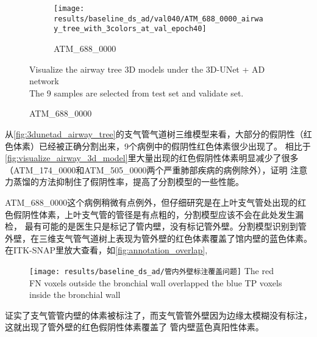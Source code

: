 \begin{figure}[!htp]
    \hfill
    \begin{subfigure}{0.325\textwidth}
        \texttt{[image: results/baseline\_ds\_ad/val040/ATM\_688\_0000\_airway\_tree\_with\_3colors\_at\_val\_epoch40]}
        \caption{ATM\_688\_0000}
    \end{subfigure}
        {Visualize the airway tree 3D models under the 3D-UNet + AD network\\
        The 9 samples are selected from test set and validate set.}
    \label{fig:3dunetad_airway_tree}
\end{figure}

从\autoref{fig:3dunetad_airway_tree}的支气管气道树三维模型来看，大部分的假阴性（红色体素）已经被正确分割出来，9个病例中的假阴性红色体素很少出现了。
相比于\autoref{fig:visualize_airway_3d_model}里大量出现的红色假阴性体素明显减少了很多（ATM\_174\_0000和ATM\_505\_0000两个严重肺部疾病的病例除外），证明
注意力蒸馏的方法抑制住了假阴性率，提高了分割模型的一些性能。

ATM\_688\_0000这个病例稍微有点例外，但仔细研究是在上叶支气管处出现的红色假阴性体素，上叶支气管的管径是有点粗的，分割模型应该不会在此处发生漏检，
最有可能的是医生只是标记了管内壁，没有标记管外壁。分割模型识别到管外壁，在三维支气管气道树上表现为管外壁的红色体素覆盖了馆内壁的蓝色体素。
在ITK-SNAP里放大查看，如\autoref{fig:annotation_overlap},
\begin{figure}[htp]
    \centering
    \texttt{[image: results/baseline\_ds\_ad/管内外壁标注覆盖问题]}
    	{The red FN voxels outside the bronchial wall overlapped the blue TP voxels inside the bronchial wall}
    \label{fig:annotation_overlap}
\end{figure}
证实了支气管管内壁的体素被标注了，而支气管管外壁因为边缘太模糊没有标注，这就出现了管外壁的红色假阴性体素覆盖了
管内壁蓝色真阳性体素。

